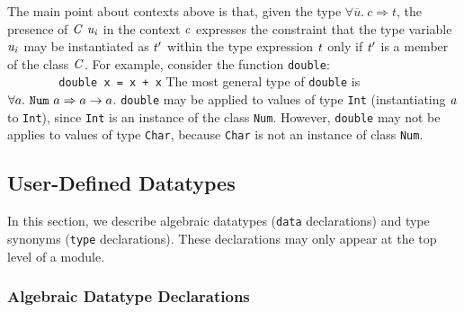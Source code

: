 The main point about contexts above is that, given the type
$\forall \overline{u}.~c \Rightarrow t$,
the presence of \mbox{$\it C\ u_i$} in the context \mbox{$\it c$} expresses the
constraint that the type variable \mbox{$\it u_i$} may be instantiated as \mbox{$\it t'$}
within the type expression \mbox{$\it t$} only if \mbox{$\it t'$} is a member of the class
\mbox{$\it C$}.  For example, consider the function \mbox{\tt double}:
\bprog
\mbox{\tt \ \ \ \ \ \ \ \ double\ x\ =\ x\ +\ x}
\eprog
The most general type of \mbox{\tt double} is
$\forall a.~\mbox{\tt Num}~a \Rightarrow a \rightarrow a$.
\mbox{\tt double} may be applied to values of type \mbox{\tt Int} (instantiating \mbox{$\it a$} to
\mbox{\tt Int}), since \mbox{\tt Int} is an instance of the class \mbox{\tt Num}.  However,
\mbox{\tt double} may not be applies to values of type \mbox{\tt Char}, because \mbox{\tt Char}
is not an instance of class \mbox{\tt Num}.


\subsection{User-Defined Datatypes}
\label{user-defined-datatypes}

In this section, we describe algebraic datatypes (\mbox{\tt data} declarations)
and type synonyms (\mbox{\tt type} declarations).  These declarations
may only appear at the top level of a module.

\subsubsection{Algebraic Datatype Declarations}
\label{datatype-decls}

